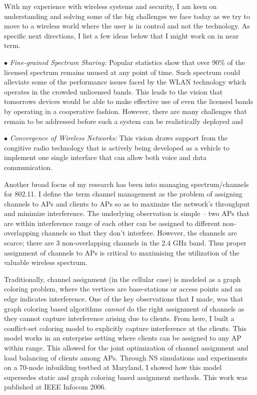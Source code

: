 \documentclass[11pt,letterpaper]{article}
\begin{document}
 With my experience with wireless systems and security, I am keen on 
understanding and solving some of the big challenges we face today as we try to move to a wireless world
where the user is in control and not the technology. As specific next directions, I list a few ideas below that I might
work on in near term.

$\bullet$ {\it Fine-grained Spectrum Sharing:} Popular statistics show that over 90\% of the licensed spectrum remains
unused at any point of time.  Such spectrum could alleviate some of the performance issues faced by the WLAN technology
which operates in the crowded unlicensed bands. This leads to the vision that tomorrows devices would be able to make
effective use of even the licensed bands by operating in a cooperative fashion. However, there are many challenges that
remain to be addressed  before such a system can be realistically deployed and 

$\bullet$ {\it Convergence of Wireless Networks:} This vision draws support from the congitive radio technology that
is actively being developed as a vehicle to implement one single interface that can allow both voice and data
communication. 

\iffalse
Another broad focus of my research  has been into managing spectrum/channels for 802.11. I define the term channel management
as the problem of assigning channels to APs and clients to APs so as to maximize the network's throughput and minimize
interference. The underlying observation is simple -- two APs that are within interference range of each other can be
assigned to different non-overlapping channels so that they don't interfere. However, the channels are scarce; there are
3 non-overlapping channels in the 2.4 GHz band. Thus proper assignment of channels to APs is critical to maximising the
utilization of the valuable wireless spectrum. 

Traditionally, channel assignment (in the cellular case) is modeled as a graph coloring problem, where the vertices are
base-stations or access points and an edge indicates interference. One of the key observations that I made, was that
graph coloring based algorithms {\it cannot} do the right assignment of channels as they cannot capture interference
arising due to clients. From here, I built a conflict-set coloring model to explicitly capture interference at the
clients. This model works in an enterprise setting where clients can be assigned to any AP within range. This allowed
for the joint optimization of channel assignment and load balancing of clients among APs. Through NS simulations and
experiments on a 70-node inbuilding testbed at Maryland, I showed how this model supersedes static and graph coloring
based assignment methods. This work was published at IEEE Infocom 2006. 
\end{document}
